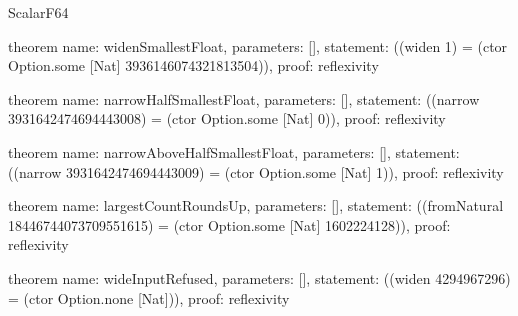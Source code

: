 \begin{lexlean}{ScalarF64}
\begin{semanticmodule}
theorem{
  name: widenSmallestFloat,
  parameters: [],
  statement: ((widen 1) = (ctor Option.some [Nat] 3936146074321813504)),
  proof: reflexivity{}
}

theorem{
  name: narrowHalfSmallestFloat,
  parameters: [],
  statement: ((narrow 3931642474694443008) = (ctor Option.some [Nat] 0)),
  proof: reflexivity{}
}

theorem{
  name: narrowAboveHalfSmallestFloat,
  parameters: [],
  statement: ((narrow 3931642474694443009) = (ctor Option.some [Nat] 1)),
  proof: reflexivity{}
}

theorem{
  name: largestCountRoundsUp,
  parameters: [],
  statement: ((fromNatural 18446744073709551615) = (ctor Option.some [Nat] 1602224128)),
  proof: reflexivity{}
}

theorem{
  name: wideInputRefused,
  parameters: [],
  statement: ((widen 4294967296) = (ctor Option.none [Nat])),
  proof: reflexivity{}
}
\end{semanticmodule}
\end{lexlean}
